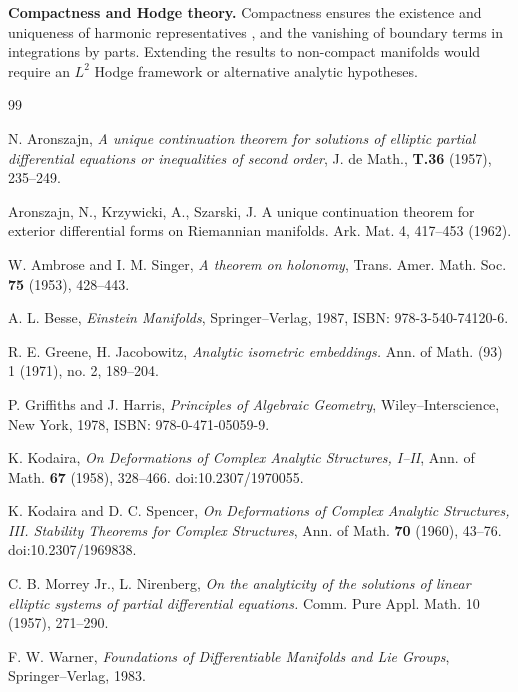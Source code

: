 \documentclass[11pt,reqno]{amsart}
\theoremstyle{plain}
\theoremstyle{definition}
\numberwithin{equation}{section}
\begin{document}
\medskip
\noindent\textbf{Compactness and Hodge theory.}
Compactness ensures the existence and uniqueness of harmonic representatives \cite{W (1983)}, and the vanishing of boundary terms in integrations by parts. Extending the results to non-compact manifolds would require an $L^2$ Hodge framework or alternative analytic hypotheses.



\begin{thebibliography}{99}

N. Aronszajn, \emph{A unique continuation theorem for solutions of elliptic partial differential equations or inequalities of second order}, J. de Math., \textbf{T.36} (1957), 235--249.

Aronszajn, N., Krzywicki, A., Szarski, J. A unique continuation theorem for exterior differential forms on Riemannian manifolds. Ark. Mat. 4, 417–453 (1962). 

W. Ambrose and I. M. Singer, \emph{A theorem on holonomy}, Trans. Amer. Math. Soc. \textbf{75} (1953), 428--443.

A. L. Besse, \emph{Einstein Manifolds}, Springer--Verlag, 1987, ISBN: 978-3-540-74120-6.

R. E. Greene, H. Jacobowitz, \emph{Analytic isometric embeddings.} Ann. of Math. (93) 1 (1971), no. 2, 189–204.

P. Griffiths and J. Harris, \emph{Principles of Algebraic Geometry}, Wiley--Interscience, New York, 1978, ISBN: 978-0-471-05059-9.

K. Kodaira, \emph{On Deformations of Complex Analytic Structures, I--II}, Ann. of Math. \textbf{67} (1958), 328--466. doi:10.2307/1970055.

K. Kodaira and D. C. Spencer, \emph{On Deformations of Complex Analytic Structures, III. Stability Theorems for Complex Structures}, Ann. of Math. \textbf{70} (1960), 43--76. doi:10.2307/1969838.

C. B. Morrey Jr., L. Nirenberg, \emph{On the analyticity of the solutions of linear elliptic systems of partial differential equations.} Comm. Pure Appl. Math. 10 (1957), 271–290.

F. W. Warner, \emph{Foundations of Differentiable Manifolds and Lie Groups}, Springer--Verlag, 1983.

\end{thebibliography}
\end{document}
